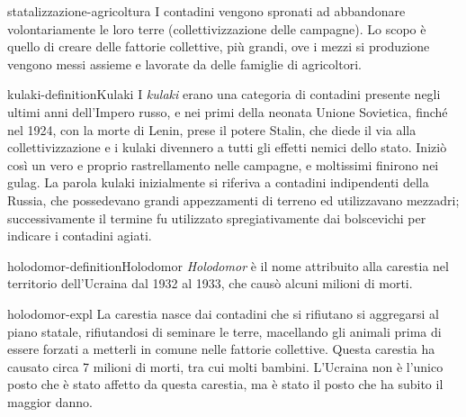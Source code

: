 \documentclass[preview]{standalone}
\begin{document}
\begin{snippet}{statalizzazione-agricoltura}
    I contadini vengono spronati ad abbandonare volontariamente le loro terre
    (collettivizzazione delle campagne).
    Lo scopo è quello di creare delle fattorie collettive, più grandi,
    ove i mezzi si produzione vengono messi assieme e lavorate da delle famiglie
    di agricoltori.
\end{snippet}

\begin{snippetdefinition}{kulaki-definition}{Kulaki}
    I \textit{kulaki} erano una categoria di contadini
    presente negli ultimi anni dell'Impero russo, e nei primi
    della neonata Unione Sovietica, finché nel 1924,
    con la morte di Lenin, prese il potere Stalin, che diede il
    via alla collettivizzazione e i kulaki divennero a tutti gli effetti
    nemici dello stato. Iniziò così un vero e proprio rastrellamento nelle
    campagne, e moltissimi finirono nei gulag.
    La parola kulaki inizialmente si riferiva a contadini indipendenti
    della Russia, che possedevano grandi appezzamenti di terreno ed
    utilizzavano mezzadri; successivamente il termine fu utilizzato
    spregiativamente dai bolscevichi per indicare i contadini agiati. 
\end{snippetdefinition}

\begin{snippetdefinition}{holodomor-definition}{Holodomor}
    \textit{Holodomor} è il nome attribuito alla carestia nel territorio dell'Ucraina dal 1932 al 1933, che causò alcuni milioni di morti.
\end{snippetdefinition}

\begin{snippet}{holodomor-expl}
    La carestia nasce dai contadini che si rifiutano si aggregarsi al piano statale,
    rifiutandosi di seminare le terre, macellando gli animali prima
    di essere forzati a metterli in comune nelle fattorie collettive.
    Questa carestia ha causato circa 7 milioni di morti, tra cui molti bambini.
    L'Ucraina non è l'unico posto che è stato affetto da questa carestia,
    ma è stato il posto che ha subito il maggior danno.
\end{snippet}


\end{document}
